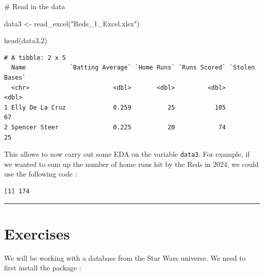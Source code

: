 \documentclass[
  letterpaper,
  DIV=11,
  numbers=noendperiod]{scrreprt}
\newenvironment{Shaded}{\begin{snugshade}}{\end{snugshade}}
\newcommand{\AttributeTok}[1]{\textcolor[rgb]{0.40,0.45,0.13}{#1}}
\newcommand{\CommentTok}[1]{\textcolor[rgb]{0.37,0.37,0.37}{#1}}
\newcommand{\DecValTok}[1]{\textcolor[rgb]{0.68,0.00,0.00}{#1}}
\newcommand{\FunctionTok}[1]{\textcolor[rgb]{0.28,0.35,0.67}{#1}}
\newcommand{\NormalTok}[1]{\textcolor[rgb]{0.00,0.23,0.31}{#1}}
\newcommand{\OtherTok}[1]{\textcolor[rgb]{0.00,0.23,0.31}{#1}}
\newcommand{\SpecialCharTok}[1]{\textcolor[rgb]{0.37,0.37,0.37}{#1}}
\newcommand{\StringTok}[1]{\textcolor[rgb]{0.13,0.47,0.30}{#1}}
\begin{document}
\begin{Shaded}
\begin{Highlighting}[]
\CommentTok{\# Read in the data}

\NormalTok{data3 }\OtherTok{\textless{}{-}} \FunctionTok{read\_excel}\NormalTok{(}\StringTok{"Reds\_1\_Excel.xlsx"}\NormalTok{)}

\FunctionTok{head}\NormalTok{(data3,}\DecValTok{2}\NormalTok{)}
\end{Highlighting}
\end{Shaded}

\begin{verbatim}
# A tibble: 2 x 5
  Name            `Batting Average` `Home Runs` `Runs Scored` `Stolen Bases`
  <chr>                       <dbl>       <dbl>         <dbl>          <dbl>
1 Elly De La Cruz             0.259          25           105             67
2 Spencer Steer               0.225          20            74             25
\end{verbatim}

This allows to now carry out some EDA on the variable \texttt{data3}.
For example, if we wanted to sum up the number of home runs hit by the
Reds in 2024, we could use the following code :

\begin{Shaded}
\end{Shaded}

\begin{verbatim}
[1] 174
\end{verbatim}

\begin{center}\rule{0.5\linewidth}{0.5pt}\end{center}

\section*{Exercises}\label{exercises-7}


We will be working with a database from the Star Wars universe. We need
to first install the package :
\end{document}
